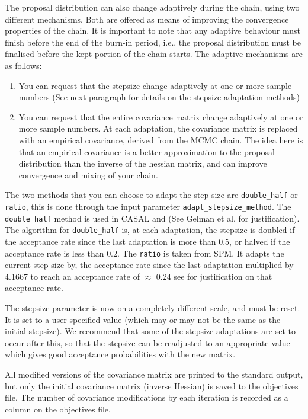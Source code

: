The proposal distribution can also change adaptively during the chain, using two different mechanisms. Both are offered as means of improving the convergence properties of the chain. It is important to note that any adaptive behaviour must finish before the end of the burn-in period, i.e., the proposal distribution must be finalised before the kept portion of the chain starts. The adaptive mechanisms are as follows:

\begin{enumerate}
\item You can request that the stepsize change adaptively at one or more sample numbers (See next paragraph for details on the stepsize adaptation methods)

\item You can request that the entire covariance matrix change adaptively at one or more sample numbers. At each adaptation, the covariance matrix is replaced with an empirical covariance, derived from the MCMC chain. The idea here is that an empirical covariance is a better approximation to the proposal distribution than the inverse of the hessian matrix, and can improve convergence and mixing of your chain.
\end{enumerate}

The two methods that you can choose to adapt the step size are \texttt{double\_half} or \texttt{ratio}, this is done through the input parameter \texttt{adapt\_stepsize\_method}. The \texttt{double\_half} method is used in CASAL and (See Gelman et al. \citep{823} for justification). The algorithm for \texttt{double\_half} is, at each adaptation, the stepsize is doubled if the acceptance rate since the last adaptation is more than $0.5$, or halved if the acceptance rate is less than $0.2$. The \texttt{ratio} is taken from SPM. It adapts the current step size by, the acceptance rate since the last adaptation multiplied by 4.1667 to reach an acceptance rate of $\approx$ 0.24 see \cite{mcmc_rate} for justification on that acceptance rate.

The stepsize parameter is now on a completely different scale, and must be reset. It is set to a user-specified value (which may or may not be the same as the initial stepsize). We recommend that some of the stepsize adaptations are set to occur after this, so that the stepsize can be readjusted to an appropriate value which gives good acceptance probabilities with the new matrix.

All modified versions of the covariance matrix are printed to the standard output, but only the initial covariance matrix (inverse Hessian) is saved to the objectives file. The number of covariance modifications by each iteration is recorded as a column on the objectives file.

